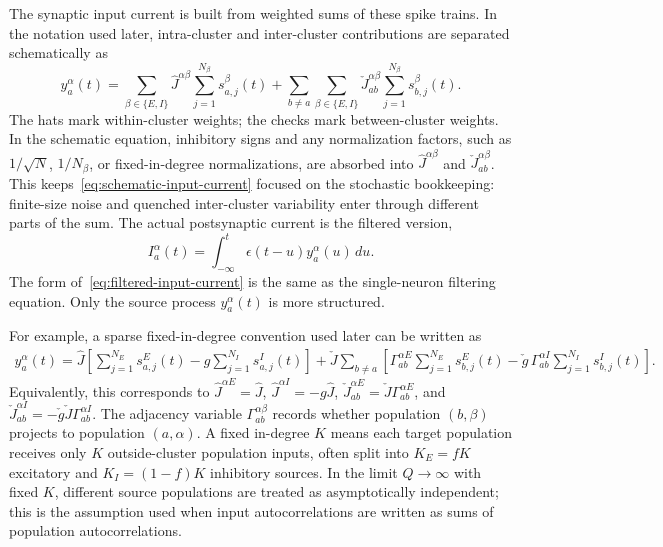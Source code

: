 The synaptic input current is built from weighted sums of these spike trains. In the notation used later, intra-cluster and inter-cluster contributions are separated schematically as
%
\begin{equation}
  y_a^\alpha(t)
  =
  \sum_{\beta\in\{E,I\}}
  \hat{J}^{\alpha\beta}
  \sum_{j=1}^{N_\beta} s_{a,j}^{\beta}(t)
  +
  \sum_{b\ne a}
  \sum_{\beta\in\{E,I\}}
  \check{J}_{ab}^{\alpha\beta}
  \sum_{j=1}^{N_\beta} s_{b,j}^{\beta}(t).
  \label{eq:schematic-input-current}
\end{equation}
%
The hats mark within-cluster weights; the checks mark between-cluster weights. In the schematic equation, inhibitory signs and any normalization factors, such as $1/\sqrt{N}$, $1/N_\beta$, or fixed-in-degree normalizations, are absorbed into $\hat{J}^{\alpha\beta}$ and $\check{J}_{ab}^{\alpha\beta}$. This keeps~\eqref{eq:schematic-input-current} focused on the stochastic bookkeeping: finite-size noise and quenched inter-cluster variability enter through different parts of the sum. The actual postsynaptic current is the filtered version,
%
\begin{equation}
  I_a^\alpha(t)
  =
  \int_{-\infty}^{t}\epsilon(t-u)y_a^\alpha(u)\,du.
  \label{eq:filtered-input-current}
\end{equation}
%
The form of~\eqref{eq:filtered-input-current} is the same as the single-neuron filtering equation. Only the source process $y_a^\alpha(t)$ is more structured.

For example, a sparse fixed-in-degree convention used later can be written as
%
\begin{equation}
\begin{aligned}
  y_a^\alpha(t)
  =
  \hat{J}
  \left[
    \sum_{j=1}^{N_E}s_{a,j}^{E}(t)
    -
    g\sum_{j=1}^{N_I}s_{a,j}^{I}(t)
  \right]
  +
  \check{J}\sum_{b\ne a}
  \left[
    \Gamma_{ab}^{\alpha E}\sum_{j=1}^{N_E}s_{b,j}^{E}(t)
    -
    \check{g}\,\Gamma_{ab}^{\alpha I}\sum_{j=1}^{N_I}s_{b,j}^{I}(t)
  \right].
\end{aligned}
\label{eq:sparse-fixed-indegree-current}
\end{equation}
%
Equivalently, this corresponds to $\hat{J}^{\alpha E}=\hat{J}$, $\hat{J}^{\alpha I}=-g\hat{J}$, $\check{J}_{ab}^{\alpha E}=\check{J}\Gamma_{ab}^{\alpha E}$, and $\check{J}_{ab}^{\alpha I}=-\check{g}\check{J}\Gamma_{ab}^{\alpha I}$. The adjacency variable $\Gamma_{ab}^{\alpha\beta}$ records whether population $(b,\beta)$ projects to population $(a,\alpha)$. A fixed in-degree $K$ means each target population receives only $K$ outside-cluster population inputs, often split into $K_E=fK$ excitatory and $K_I=(1-f)K$ inhibitory sources. In the limit $Q\to\infty$ with fixed $K$, different source populations are treated as asymptotically independent; this is the assumption used when input autocorrelations are written as sums of population autocorrelations.

